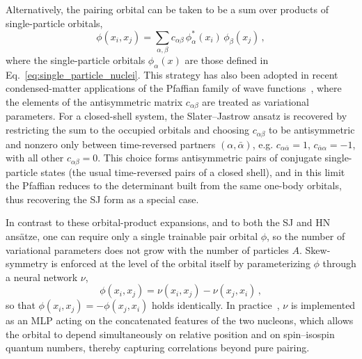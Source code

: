 Alternatively, the pairing orbital can be taken to be a sum over products of single-particle orbitals,
\begin{equation}
\phi(x_i, x_j)
= \sum_{\alpha, \beta} c_{\alpha\beta} \, \phi_{\alpha}^*(x_i)\, \phi_{\beta}(x_j)\,,
\label{eq:pf_pairing_orbital_closed}
\end{equation}
where the single-particle orbitals $\phi_{\alpha}(x)$ are those defined in Eq.~\eqref{eq:single_particle_nuclei}. This strategy has also been adopted in recent condensed-matter applications of the Pfaffian family of wave functions~\cite{gao_neural_2024}, where the elements of the antisymmetric matrix $c_{\alpha\beta}$ are treated as variational parameters. For a closed-shell system, the Slater–Jastrow ansatz is recovered by restricting the sum to the occupied orbitals and choosing $c_{\alpha\beta}$ to be antisymmetric and nonzero only between time-reversed partners $(\alpha, \bar{\alpha})$, e.g. $c_{\alpha \bar{\alpha}} = 1$,  $c_{\bar{\alpha} \alpha} = -1$, with all other $c_{\alpha\beta}=0$. This choice forms antisymmetric pairs of conjugate single-particle states (the usual time-reversed pairs of a closed shell), and in this limit the Pfaffian reduces to the determinant built from the same one-body orbitals, thus recovering the SJ form as a special case.

In contrast to these orbital-product expansions, and to both the SJ and HN ansätze, one can require only a single trainable pair orbital $\phi$, so the number of variational parameters does not grow with the number of particles $A$. Skew-symmetry is enforced at the level of the orbital itself by parameterizing $\phi$ through a neural network $\nu$,
\begin{equation}
\phi(x_i, x_j)
= \nu(x_i, x_j) - \nu(x_j, x_i)\,,
\end{equation}
so that $\phi(x_i, x_j) = - \phi(x_j, x_i)$ holds identically. In practice~\cite{kim_neural-network_2024,fore_investigating_2024}, $\nu$ is implemented as an MLP acting on the concatenated features of the two nucleons, which allows the orbital to depend simultaneously on relative position and on spin–isospin quantum numbers, thereby capturing correlations beyond pure pairing.

